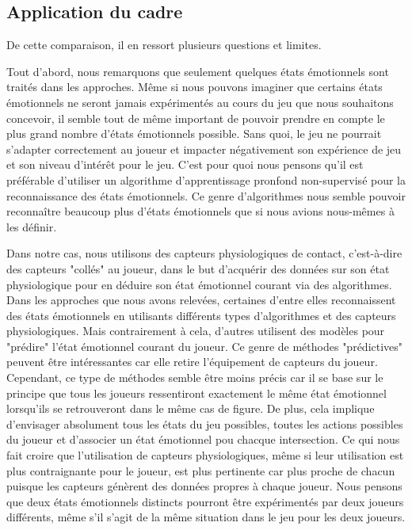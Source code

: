\documentclass{article}
\begin{document}
	\subsection{Application du cadre}
		De cette comparaison, il en ressort plusieurs questions et limites.\par
		Tout d'abord, nous remarquons que seulement quelques états émotionnels sont traités dans les approches. 
		Même si nous pouvons imaginer que certains états émotionnels ne seront jamais expérimentés au cours du jeu que nous souhaitons concevoir, il semble tout de même important de pouvoir prendre en compte le plus grand nombre d'états émotionnels possible.
		Sans quoi, le jeu ne pourrait s'adapter correctement au joueur et impacter négativement son expérience de jeu et son niveau d'intérêt pour le jeu.
		C'est pour quoi nous pensons qu'il est préférable d'utiliser un algorithme d'apprentissage pronfond non-supervisé pour la reconnaissance des états émotionnels.
		Ce genre d'algorithmes nous semble pouvoir reconnaître beaucoup plus d'états émotionnels que si nous avions nous-mêmes à les définir.\par
		Dans notre cas, nous utilisons des capteurs physiologiques de contact, c'est-à-dire des capteurs "collés" au joueur, dans le but d'acquérir des données sur son état physiologique pour en déduire son état émotionnel courant via des algorithmes.
		Dans les approches que nous avons relevées, certaines d'entre elles reconnaissent des états émotionnels en utilisants différents types d'algorithmes et des capteurs physiologiques. 
		Mais contrairement à cela, d'autres utilisent des modèles pour "prédire" l'état émotionnel courant du joueur.
		Ce genre de méthodes "prédictives" peuvent être intéressantes car elle retire l'équipement de capteurs du joueur.
		Cependant, ce type de méthodes semble être moins précis car il se base sur le principe que tous les joueurs ressentiront exactement le même état émotionnel lorsqu'ils se retrouveront dans le même cas de figure. 
		De plus, cela implique d'envisager absolument tous les états du jeu possibles, toutes les actions possibles du joueur et d'associer un état émotionnel pou chacque intersection.
		Ce qui nous fait croire que l'utilisation de capteurs physiologiques, même si leur utilisation est plus contraignante pour le joueur, est plus pertinente car plus proche de chacun puisque les capteurs génèrent des données propres à chaque joueur.
		Nous pensons que deux états émotionnels distincts pourront être expérimentés par deux joueurs différents, même s'il s'agit de la même situation dans le jeu pour les deux joueurs.
\end{document}
